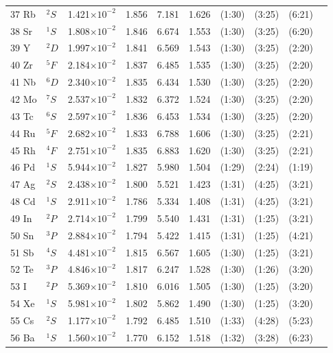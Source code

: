 \documentclass[12pt]{report}
\begin{document}
\begin{longtable}{l l r r r r r r r r}
37 Rb & $^{2}S$ & 1.421$\times10^{-2}$ & 1.856 & 7.181 & 1.626 & (1:30) & (3:25) & (6:21)   \\
38 Sr & $^{1}S$ & 1.808$\times10^{-2}$ & 1.846 & 6.674 & 1.553 & (1:30) & (3:25) & (6:20)   \\
39 Y & $^{2}D$ & 1.997$\times10^{-2}$ & 1.841 & 6.569 & 1.543 & (1:30) & (3:25) & (2:20)   \\
40 Zr & $^{5}F$ & 2.184$\times10^{-2}$ & 1.837 & 6.485 & 1.535 & (1:30) & (3:25) & (2:20)   \\
41 Nb & $^{6}D$ & 2.340$\times10^{-2}$ & 1.835 & 6.434 & 1.530 & (1:30) & (3:25) & (2:20)   \\
42 Mo & $^{7}S$ & 2.537$\times10^{-2}$ & 1.832 & 6.372 & 1.524 & (1:30) & (3:25) & (2:20)   \\
43 Tc & $^{6}S$ & 2.597$\times10^{-2}$ & 1.836 & 6.453 & 1.534 & (1:30) & (3:25) & (2:20)   \\
44 Ru & $^{5}F$ & 2.682$\times10^{-2}$ & 1.833 & 6.788 & 1.606 & (1:30) & (3:25) & (2:21)   \\
45 Rh & $^{4}F$ & 2.751$\times10^{-2}$ & 1.835 & 6.883 & 1.620 & (1:30) & (3:25) & (2:21)   \\
46 Pd & $^{1}S$ & 5.944$\times10^{-2}$ & 1.827 & 5.980 & 1.504 & (1:29) & (2:24) & (1:19)   \\
47 Ag & $^{2}S$ & 2.438$\times10^{-2}$ & 1.800 & 5.521 & 1.423 & (1:31) & (4:25) & (3:21)   \\
48 Cd & $^{1}S$ & 2.911$\times10^{-2}$ & 1.786 & 5.334 & 1.408 & (1:31) & (4:25) & (3:21)   \\
49 In & $^{2}P$ & 2.714$\times10^{-2}$ & 1.799 & 5.540 & 1.431 & (1:31) & (1:25) & (3:21)   \\
50 Sn & $^{3}P$ & 2.884$\times10^{-2}$ & 1.794 & 5.422 & 1.415 & (1:31) & (1:25) & (4:21)   \\
51 Sb & $^{4}S$ & 4.481$\times10^{-2}$ & 1.815 & 6.567 & 1.605 & (1:30) & (1:25) & (3:21)   \\
52 Te & $^{3}P$ & 4.846$\times10^{-2}$ & 1.817 & 6.247 & 1.528 & (1:30) & (1:26) & (3:20)   \\
53 I & $^{2}P$ & 5.369$\times10^{-2}$ & 1.810 & 6.016 & 1.505 & (1:30) & (1:25) & (3:20)   \\
54 Xe & $^{1}S$ & 5.981$\times10^{-2}$ & 1.802 & 5.862 & 1.490 & (1:30) & (1:25) & (3:20)   \\
55 Cs & $^{2}S$ & 1.177$\times10^{-2}$ & 1.792 & 6.485 & 1.510 & (1:33) & (4:28) & (5:23)   \\
56 Ba & $^{1}S$ & 1.560$\times10^{-2}$ & 1.770 & 6.152 & 1.518 & (1:32) & (3:28) & (6:23)   \\

\end{longtable}
\end{document}
